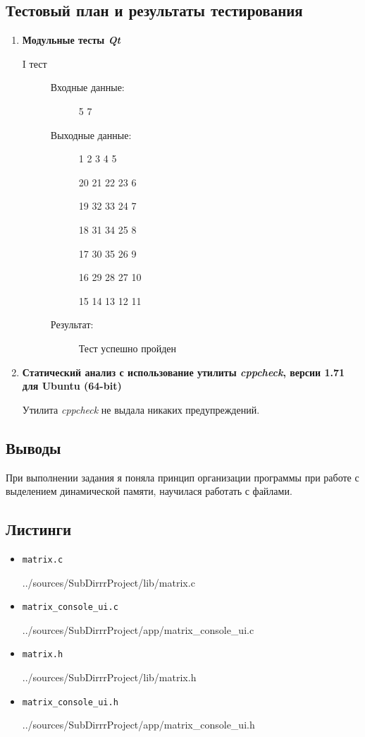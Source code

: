 \documentclass[12pt,a4paper]{report}
\begin{document}
\subsection{Тестовый план и результаты тестирования}
\hspace{\parindent}
\begin{enumerate}
\item \textbf{Модульные тесты \textit{Qt}}

\begin{description}
\item[I тест]
\hspace{\parindent}
\begin{flushleft}
\begin{description}
\item[Входные данные:] 5 7
\item[Выходные данные:]
\hspace{\parindent}
\begin{flushleft}
 1  2  3  4  5 

20 21 22 23  6

19 32 33 24  7

18 31 34 25  8

17 30 35 26  9

16 29 28 27 10

15 14 13 12 11
\end{flushleft}
\item[Результат:] Тест успешно пройден
\end{description}
\end{flushleft}
\end{description}

\item \textbf{Статический анализ с использование утилиты \textit{cppcheck}, версии 1.71 для Ubuntu (64-bit)}

Утилита \textit{cppcheck} не выдала никаких предупреждений.
\end{enumerate}
\subsection{Выводы}
\hspace{\parindent}
При выполнении задания я поняла принцип организации программы при работе с выделением динамической памяти, научилася работать с файлами.
\subsection*{Листинги}
\begin{itemize}
\item[] \verb-matrix.c-

{../sources/SubDirrrProject/lib/matrix.c}
\item[] \verb-matrix_console_ui.c-

{../sources/SubDirrrProject/app/matrix_console_ui.c}
\item[] \verb-matrix.h-

{../sources/SubDirrrProject/lib/matrix.h}
\item[] \verb-matrix_console_ui.h-

{../sources/SubDirrrProject/app/matrix_console_ui.h}
\end{itemize}
\end{document}
